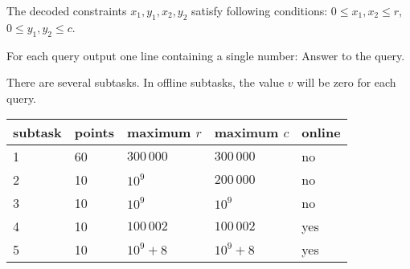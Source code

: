 The decoded constraints $x_1, y_1, x_2, y_2$ satisfy following conditions:
$0 \leq x_1, x_2 \leq r$, $0 \leq y_1, y_2 \leq c$. 


For each query output one line containing a single number: Answer to the query.


There are several subtasks. In offline subtasks, the value $v$ will be zero for each query. 

\centering
\begin{tabular}{|l|l|l|l|l|}
\hline
subtask & points & maximum $r$  & maximum $c$   & online    \\ \hline
1       & 60     & $300\,000$   & $300\,000$    & no        \\ \hline
2       & 10     & $10^9$       & $200\,000$    & no        \\ \hline
3       & 10     & $10^9$       & $10^9$        & no        \\ \hline
4       & 10     & $100\,002$   & $100\,002$    & yes       \\ \hline
5       & 10     & $10^9 + 8$   & $10^9 + 8$    & yes       \\ \hline
\end{tabular}



\sampleIN
\sampleOUT
\sampleCOMMENT
\sampleEND
\center{
}

